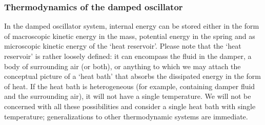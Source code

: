 \subsubsection{Thermodynamics of the damped oscillator}
In the damped oscillator system, internal energy can be stored either in the form of macroscopic kinetic energy in the mass, potential energy in the spring and as microscopic kinetic energy of the `heat reservoir'. Please note that the `heat reservoir' is rather loosely defined: it can encompass the fluid in the damper, a body of surrounding air (or both), or anything to which we may attach the conceptual picture of a `heat bath' that absorbs the dissipated energy in the form of heat. If the heat bath is heterogeneous (for example, containing damper fluid and the surrounding air), it will not have a single temperature. We will not be concerned with all these possibilities and consider a single heat bath with single temperature; generalizations to other thermodynamic systems are immediate.

